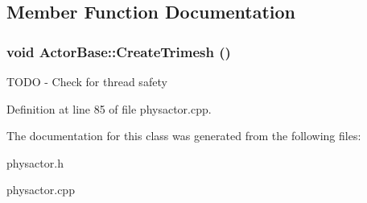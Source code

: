 \subsection{Member Function Documentation}
\hypertarget{classActorBase_af7f0806222c79b5d5120dccefd93715e}{
\subsubsection[{CreateTrimesh}]{\setlength{\rightskip}{0pt plus 5cm}void ActorBase::CreateTrimesh ()}}
\label{dd/d7b/classActorBase_af7f0806222c79b5d5120dccefd93715e}


TODO -\/ Check for thread safety 

Definition at line 85 of file physactor.cpp.

The documentation for this class was generated from the following files:\begin{DoxyCompactItemize}
\item 
physactor.h\item 
physactor.cpp\end{DoxyCompactItemize}
